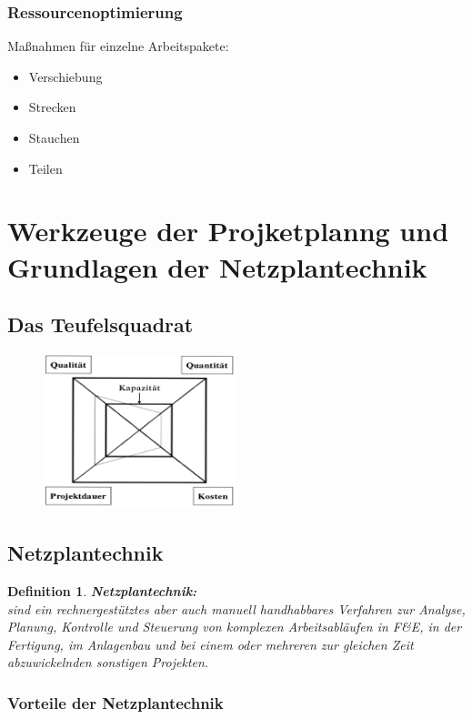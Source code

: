 \documentclass[11pt,a4paper]{article}
\newenvironment{de}[1]
{\begin{mdframed}[style=de]\begin{mydef}{\textbf{#1:}}\\} 
{\end{mydef}\end{mdframed}}
\newtheorem{mydef}{Definition}
\begin{document}
\subsubsection{Ressourcenoptimierung}
Maßnahmen für einzelne Arbeitspakete:
\begin{itemize}
\item Verschiebung
\item Strecken
\item Stauchen
\item Teilen
\end{itemize}

\section{Werkzeuge der Projketplanng und Grundlagen der Netzplantechnik}
\subsection{Das Teufelsquadrat}

\begin{figure}[H]
	\includegraphics[width=0.5\textwidth]{ch9/teufelsquadrat}
\end{figure}

\subsection{Netzplantechnik}
\begin{de}{Netzplantechnik}
sind ein rechnergestütztes aber auch manuell handhabbares Verfahren zur Analyse,
Planung, Kontrolle und Steuerung von komplexen Arbeitsabläufen in F\&E, in der
Fertigung, im Anlagenbau und bei einem oder mehreren zur gleichen Zeit
abzuwickelnden sonstigen Projekten.
\end{de}

\subsubsection{Vorteile der Netzplantechnik}
\end{document}
